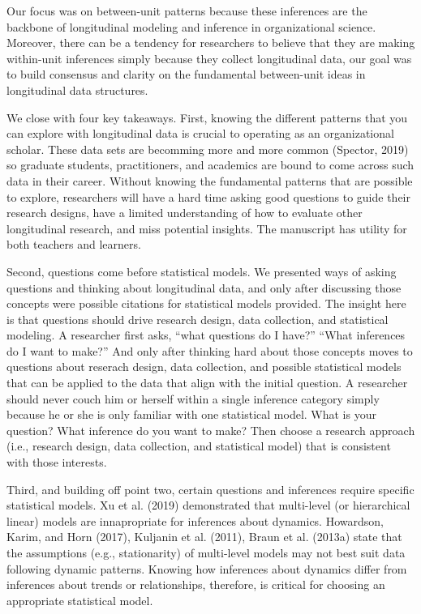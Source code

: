 \documentclass[english,,man]{apa6}
\begin{document}
Our focus was on between-unit patterns because these inferences are the backbone of longitudinal modeling and inference in organizational science. Moreover, there can be a tendency for researchers to believe that they are making within-unit inferences simply because they collect longitudinal data, our goal was to build consensus and clarity on the fundamental between-unit ideas in longitudinal data structures.

We close with four key takeaways. First, knowing the different patterns that you can explore with longitudinal data is crucial to operating as an organizational scholar. These data sets are becomming more and more common (Spector, 2019) so graduate students, practitioners, and academics are bound to come across such data in their career. Without knowing the fundamental patterns that are possible to explore, researchers will have a hard time asking good questions to guide their research designs, have a limited understanding of how to evaluate other longitudinal research, and miss potential insights. The manuscript has utility for both teachers and learners.

Second, questions come before statistical models. We presented ways of asking questions and thinking about longitudinal data, and only after discussing those concepts were possible citations for statistical models provided. The insight here is that questions should drive research design, data collection, and statistical modeling. A researcher first asks, \enquote{what questions do I have?} \enquote{What inferences do I want to make?} And only after thinking hard about those concepts moves to questions about reserach design, data collection, and possible statistical models that can be applied to the data that align with the initial question. A researcher should never couch him or herself within a single inference category simply because he or she is only familiar with one statistical model. What is your question? What inference do you want to make? Then choose a research approach (i.e., research design, data collection, and statistical model) that is consistent with those interests.

Third, and building off point two, certain questions and inferences require specific statistical models. Xu et al. (2019) demonstrated that multi-level (or hierarchical linear) models are innapropriate for inferences about dynamics. Howardson, Karim, and Horn (2017), Kuljanin et al. (2011), Braun et al. (2013a) state that the assumptions (e.g., stationarity) of multi-level models may not best suit data following dynamic patterns. Knowing how inferences about dynamics differ from inferences about trends or relationships, therefore, is critical for choosing an appropriate statistical model.
\end{document}
